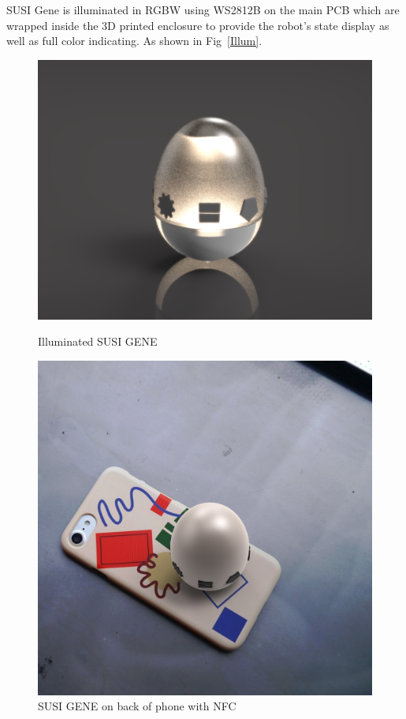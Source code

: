 \documentclass[manuscript,screen]{acmart}
\begin{document}
SUSI Gene is illuminated in RGBW using WS2812B on the main PCB which are wrapped inside the 3D printed enclosure to provide the robot’s state display as well as full color indicating. As shown in Fig~\ref{Illum}.

\begin{figure}
  \begin{minipage}{0.49\columnwidth}
    \centering
    \includegraphics[width=0.99\columnwidth]{egg4.jpg}
    \caption{Illuminated SUSI GENE}
    \label{Illum}
  \end{minipage}\hfill
  \begin{minipage}{0.49\columnwidth}
    \centering
    \includegraphics[width=0.99\columnwidth]{egg7.jpg}
    \caption{SUSI GENE on back of phone with NFC}
    \label{NFCback}
  \end{minipage}
\end{figure}
\end{document}
